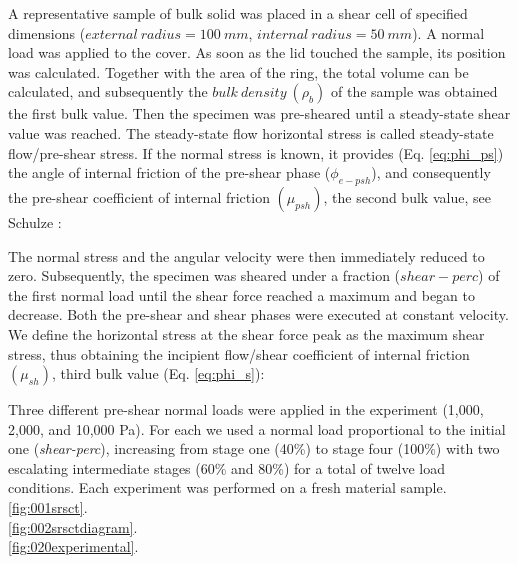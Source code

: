 A representative sample of bulk solid was placed in a shear cell of specified
dimensions ($external ~ radius = 100 ~ mm$, $internal ~ radius = 50 ~ mm$).
A normal load was applied to the cover. As soon as the lid touched the sample,
its position was calculated.
Together with the area of the ring, the total volume can be calculated, and subsequently the $bulk ~ density ~ (\rho_b)$ 
of the sample was obtained the first bulk value.
Then the specimen was pre-sheared until a steady-state shear value was reached.
The steady-state flow horizontal stress
is called steady-state flow/pre-shear stress.
If the normal stress is known, it provides (Eq. \ref{eq:phi_ps}) the angle of
internal friction of the pre-shear phase ($\phi_{e-psh}$), and consequently the
pre-shear coefficient of internal friction $ (\mu_{psh})$, the second
bulk value, see Schulze \cite{RefWorks:118}:

The normal stress and the angular velocity were then immediately reduced to zero. 
Subsequently, the specimen was sheared under a fraction ($shear-perc$) of the first normal load until the shear force 
reached a maximum and began to decrease. 
Both the pre-shear and shear phases were executed at constant velocity. 
We define the horizontal stress at the shear force peak as the maximum shear
stress, thus obtaining the incipient flow/shear coefficient of internal friction $
(\mu_{sh})$, third bulk value (Eq. \ref{eq:phi_s})\cite{RefWorks:118}:

Three different pre-shear normal loads were applied in the experiment
(1,000, 2,000, and 10,000 Pa).
For each we used a normal load proportional to the initial one
(\textit{shear-perc}), increasing from stage one (40\%) to stage four (100\%)
with two escalating intermediate stages (60\% and 80\%) for a total of twelve load conditions.
Each experiment was performed on a fresh material sample. \\

\ref{fig:001srsct}.\\


\ref{fig:002srsctdiagram}.\\


\ref{fig:020experimental}.\\


